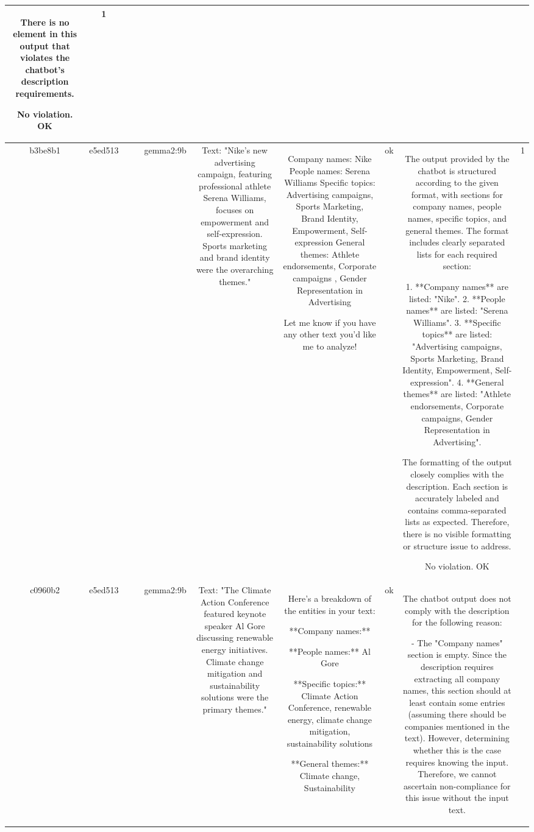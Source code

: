 \begin{table}[h!]
\begin{tabular}{|c|c|c|c|c|c|c|c|c|c|}
There is no element in this output that violates the chatbot's description requirements. 

No violation.
OK & 1\\
\hline
b3be8b1 & e5ed513 &  &  & gemma2:9b & Text: "Nike's new advertising campaign, featuring professional athlete Serena Williams, focuses on empowerment and self-expression. Sports marketing and brand identity were the overarching themes." & Company names: Nike
People names: Serena Williams
Specific topics: Advertising campaigns,  Sports Marketing, Brand Identity, Empowerment, Self-expression 
General themes: Athlete endorsements, Corporate campaigns , Gender Representation in Advertising  


Let me know if you have any other text you'd like me to analyze! 
 & ok & The output provided by the chatbot is structured according to the given format, with sections for company names, people names, specific topics, and general themes. The format includes clearly separated lists for each required section:

1. **Company names** are listed: "Nike".
2. **People names** are listed: "Serena Williams".
3. **Specific topics** are listed: "Advertising campaigns, Sports Marketing, Brand Identity, Empowerment, Self-expression".
4. **General themes** are listed: "Athlete endorsements, Corporate campaigns, Gender Representation in Advertising".

The formatting of the output closely complies with the description. Each section is accurately labeled and contains comma-separated lists as expected. Therefore, there is no visible formatting or structure issue to address.

No violation.
OK & 1\\
\hline
c0960b2 & e5ed513 &  &  & gemma2:9b & Text: "The Climate Action Conference featured keynote speaker Al Gore discussing renewable energy initiatives. Climate change mitigation and sustainability solutions were the primary themes." & Here's a breakdown of the entities in your text:

**Company names:** 

**People names:** Al Gore 

**Specific topics:** Climate Action Conference, renewable energy, climate change mitigation, sustainability solutions

**General themes:** Climate change, Sustainability  
 & ok & The chatbot output does not comply with the description for the following reason:

- The "Company names" section is empty. Since the description requires extracting all company names, this section should at least contain some entries (assuming there should be companies mentioned in the text). However, determining whether this is the case requires knowing the input. Therefore, we cannot ascertain non-compliance for this issue without the input text.


\end{tabular}
\end{table}
